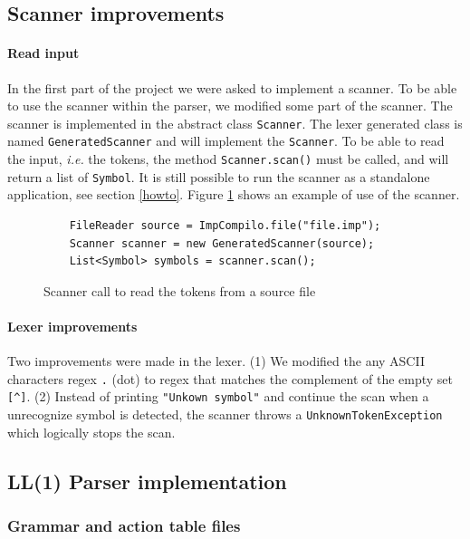 \documentclass[letterpaper]{article}
\begin{document}
\subsection{Scanner improvements}

\paragraph{Read input}
In the first part of the project we were asked to implement a scanner.
To be able to use the scanner within the parser, we modified some part of the
scanner. The scanner is implemented in the abstract class \texttt{Scanner}.
The lexer generated class is named \texttt{GeneratedScanner} and will
implement the \texttt{Scanner}. To be able to read the input, \textit{i.e.}
the tokens, the method \texttt{Scanner.scan()} must be called, and
will return a list of \texttt{Symbol}. It is still possible to run the scanner
as a standalone application, see section \ref{howto}.
Figure \ref{fig:scannercall} shows an example of use of the scanner.

\begin{figure}[H]
    \begin{lstlisting}
    FileReader source = ImpCompilo.file("file.imp");
    Scanner scanner = new GeneratedScanner(source);
    List<Symbol> symbols = scanner.scan();
    \end{lstlisting}
    \caption{Scanner call to read the tokens from a source file}
    \label{fig:scannercall}
\end{figure}

\paragraph{Lexer improvements}

Two improvements were made in the lexer. (1) We modified the any ASCII
characters
regex \texttt{.} (dot) to regex that matches the complement of the
empty set \texttt{[\textasciicircum]}.
(2) Instead of printing \texttt{"Unkown symbol"}
and continue the scan when
a unrecognize symbol is detected, the scanner throws a
\texttt{UnknownTokenException} which logically stops the scan.



\subsection{LL(1) Parser implementation}

\subsubsection{Grammar and action table files}
\end{document}
